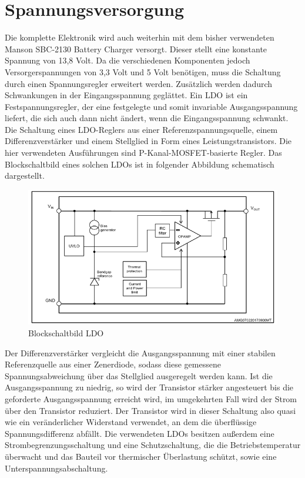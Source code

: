 \section{Spannungsversorgung}
Die komplette Elektronik wird auch weiterhin mit dem bisher verwendeten Manson SBC-2130 Battery Charger versorgt. Dieser stellt eine konstante Spannung von 13,8 Volt. Da die verschiedenen Komponenten jedoch Versorgerspannungen von 3,3 Volt und 5 Volt benötigen, muss die Schaltung durch einen Spannungsregler erweitert werden. Zusätzlich werden dadurch Schwankungen in der Eingangsspannung geglättet. 
Ein LDO ist ein Festspannungsregler, der eine festgelegte und somit invariable Ausgangsspannung liefert, die sich auch dann nicht ändert, wenn die Eingangsspannung schwankt. Die Schaltung eines LDO-Reglers aus einer Referenzspannungsquelle, einem Differenzverstärker und einem Stellglied in Form eines Leistungstransistors. Die hier verwendeten Ausführungen sind P-Kanal-MOSFET-basierte Regler. Das Blockschaltbild eines solchen LDOs ist in folgender Abbildung schematisch dargestellt.

\begin{figure}[h]
	\centering
		\includegraphics{Bilder/LDO.png}
	\caption{Blockschaltbild LDO}
	\label{fig:LDO}
\end{figure}

Der Differenzverstärker vergleicht die Ausgangsspannung mit einer stabilen Referenzquelle aus einer Zenerdiode, sodass diese gemessene Spannungsabweichung über das Stellglied ausgeregelt werden kann. Ist die Ausgangsspannung zu niedrig, so wird der Transistor stärker angesteuert bis die geforderte Ausgangsspannung erreicht wird, im umgekehrten Fall wird der Strom über den Transistor reduziert. Der Transistor wird in dieser Schaltung also quasi wie ein veränderlicher Widerstand verwendet, an dem die überflüssige Spannungsdifferenz abfällt. Die verwendeten LDOs besitzen außerdem eine Strombegrenzungsschaltung und eine Schutzschaltung, die die Betriebstemperatur überwacht und das Bauteil vor thermischer Überlastung schützt, sowie eine Unterspannungsabschaltung.